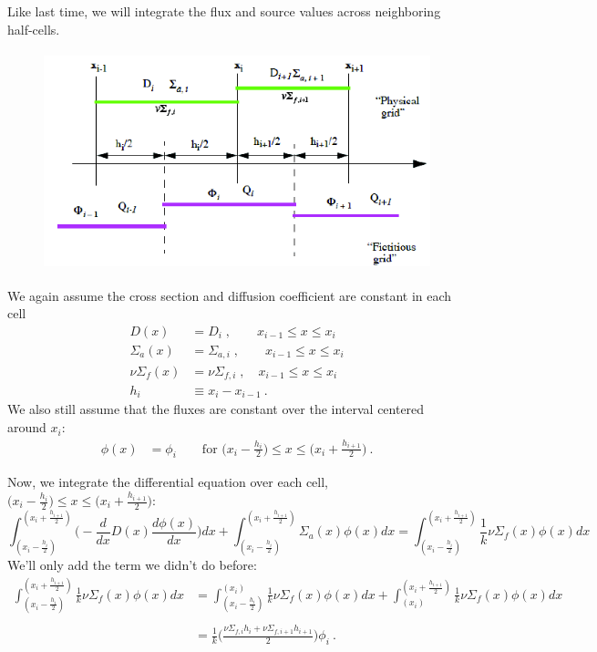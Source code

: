 \documentclass[12pt]{article}
\begin{document}
Like last time, we will integrate the flux and source values across neighboring half-cells.
%
\begin{figure}[h!]
\includegraphics[height=2.5in]{FVM-eig-fig}
\end{figure}

We again assume the cross section and diffusion coefficient are constant in each cell 
\begin{align}
D(x) &= D_i\;, \qquad x_{i-1} \leq x \leq x_i \nonumber \\
\Sigma_a(x) &= \Sigma_{a,i}\;, \qquad x_{i-1} \leq x \leq x_i \nonumber \\
\nu\Sigma_f(x) &= \nu\Sigma_{f,i}\;, \quad x_{i-1} \leq x \leq x_i \nonumber \\
h_i &\equiv x_{i} - x_{i-1} \:.\nonumber 
\end{align}
%
We also still assume that the fluxes are constant over the interval centered around $x_i$:
%
\begin{align}
\phi(x) &= \phi_i \qquad \text{for } \bigl(x_i - \frac{h_i}{2}\bigr) \leq x \leq \bigl(x_i + \frac{h_{i+1}}{2}\bigr)\:. \nonumber %
\end{align}

Now, we integrate the differential equation over each cell, $\bigl(x_i - \frac{h_i}{2}\bigr) \leq x \leq \bigl(x_i + \frac{h_{i+1}}{2}\bigr)$:
%
\[\int_{(x_i - \frac{h_i}{2})}^{(x_i + \frac{h_{i+1}}{2})} \biggl(  -\frac{d}{dx}D(x)\frac{d \phi(x)}{dx}\biggr) dx 
+ \int_{(x_i - \frac{h_i}{2})}^{(x_i + \frac{h_{i+1}}{2})} \Sigma_a(x) \phi(x) dx 
= \int_{(x_i - \frac{h_i}{2})}^{(x_i + \frac{h_{i+1}}{2})} \frac{1}{k}\nu \Sigma_f(x) \phi(x) dx\]
%
We'll only add the term we didn't do before:
%
\begin{align}
\int_{(x_i - \frac{h_i}{2})}^{(x_i + \frac{h_{i+1}}{2})} \frac{1}{k}\nu \Sigma_f(x)\phi(x) dx &= 
%
\int_{(x_i - \frac{h_i}{2})}^{(x_i)} \frac{1}{k}\nu \Sigma_f(x) \phi(x) dx + \int_{(x_i)}^{(x_i + \frac{h_{i+1}}{2})} \frac{1}{k}\nu \Sigma_f(x) \phi(x) dx \nonumber\\
%
&\nonumber \\
&= \frac{1}{k} \biggl(\frac{\nu\Sigma_{f,i}h_i + \nu\Sigma_{f,i+1}h_{i+1}}{2} \biggr)\phi_i \:.\nonumber 
\end{align}
\end{document}
